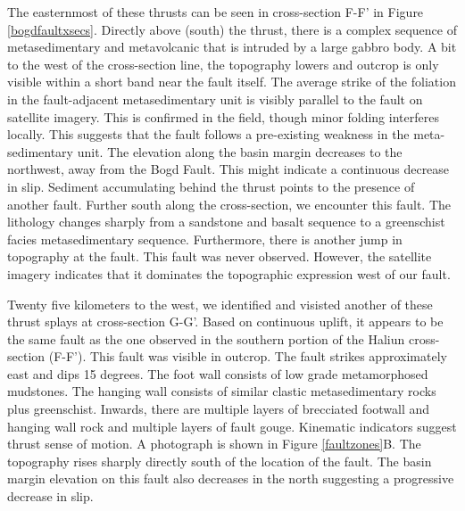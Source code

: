 The easternmost of these thrusts can be seen in cross-section F-F' in Figure \ref{bogdfaultxsecs}. Directly above (south) the thrust, there is a complex sequence of metasedimentary and metavolcanic that is intruded by a large gabbro body. A bit to the west of the cross-section line, the topography lowers and outcrop is only visible within a short band near the fault itself. The average strike of the foliation in the fault-adjacent metasedimentary unit is visibly parallel to the fault on satellite imagery. This is confirmed in the field, though minor folding interferes locally. This suggests that the fault follows a pre-existing weakness in the meta-sedimentary unit. The elevation along the basin margin decreases to the northwest, away from the Bogd Fault. This might indicate a continuous decrease in slip. Sediment accumulating behind the thrust points to the presence of another fault. Further south along the cross-section, we encounter this fault. The lithology changes sharply from a sandstone and basalt sequence to a greenschist facies metasedimentary sequence. Furthermore, there is another jump in topography at the fault. This fault was never observed. However, the satellite imagery indicates that it dominates the topographic expression west of our fault. 

Twenty five kilometers to the west, we identified and visisted another of these thrust splays at cross-section G-G'. Based on continuous uplift, it appears to be the same fault as the one observed in the southern portion of the Haliun cross-section (F-F'). This fault was visible in outcrop. The fault strikes approximately east and dips 15 degrees. The foot wall consists of low grade metamorphosed mudstones. The hanging wall consists of similar clastic metasedimentary rocks plus greenschist. Inwards, there are multiple layers of brecciated footwall and hanging wall rock and multiple layers of fault gouge. Kinematic indicators suggest thrust sense of motion. A photograph is shown in Figure \ref{faultzones}B. The topography rises sharply directly south of the location of the fault. The basin margin elevation on this fault also decreases in the north suggesting a progressive decrease in slip.



